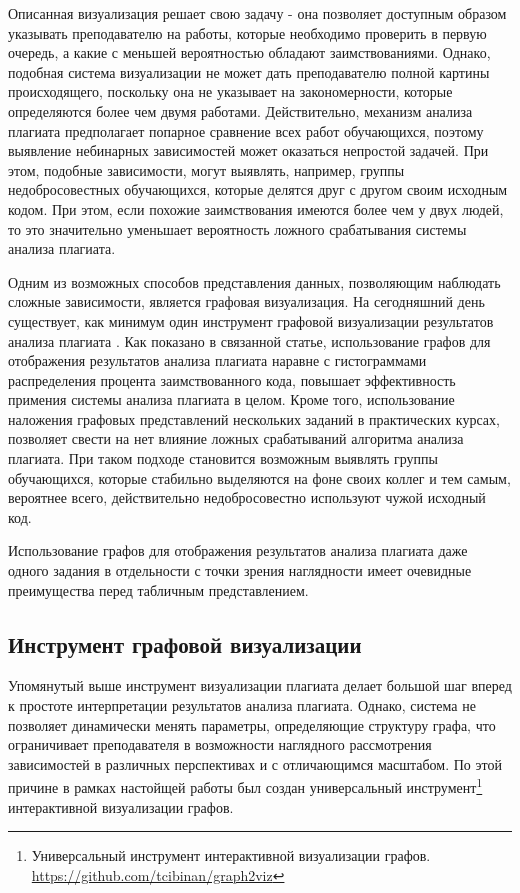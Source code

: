 \documentclass[a4paper,14pt]{extarticle}
\begin{document}
Описанная визуализация решает свою задачу - она позволяет доступным образом указывать преподавателю на работы, которые необходимо проверить в первую очередь, а какие с меньшей вероятностью обладают заимствованиями. Однако, подобная система визуализации не может дать преподавателю полной картины происходящего, поскольку она не указывает на закономерности, которые определяются более чем двумя работами. Действительно, механизм анализа плагиата предполагает попарное сравнение всех работ обучающихся, поэтому выявление небинарных зависимостей может оказаться непростой задачей. При этом, подобные зависимости, могут выявлять, например, группы недобросовестных обучающихся, которые делятся друг с другом своим исходным кодом. При этом, если похожие заимствования имеются более чем у двух людей, то это значительно уменьшает вероятность ложного срабатывания системы анализа плагиата.

Одним из возможных способов представления данных, позволяющим наблюдать сложные зависимости, является графовая визуализация. На сегодняшний день существует, как минимум один инструмент графовой визуализации результатов анализа плагиата \citep{plagiarismGraph}. Как показано в связанной статье, использование графов для отображения результатов анализа плагиата наравне с гистограммами распределения процента заимствованного кода, повышает эффективность примения системы анализа плагиата в целом. Кроме того, использование наложения графовых представлений нескольких заданий в практических курсах, позволяет свести на нет влияние ложных срабатываний алгоритма анализа плагиата. При таком подходе становится возможным выявлять группы обучающихся, которые стабильно выделяются на фоне своих коллег и тем самым, вероятнее всего, действительно недобросовестно используют чужой исходный код.

Использование графов для отображения результатов анализа плагиата даже одного задания в отдельности с точки зрения наглядности имеет очевидные преимущества перед табличным представлением.

\subsection{Инструмент графовой визуализации}

Упомянутый выше инструмент визуализации плагиата делает большой шаг вперед к простоте интерпретации результатов анализа плагиата. Однако, система не позволяет динамически менять параметры, определяющие структуру графа, что ограничивает преподавателя в возможности наглядного рассмотрения зависимостей в различных перспективах и с отличающимся масштабом. По этой причине в рамках настойщей работы был создан универсальный инструмент\footnote{Универсальный инструмент интерактивной визуализации графов. \url{https://github.com/tcibinan/graph2viz}} интерактивной визуализации графов.
\end{document}
